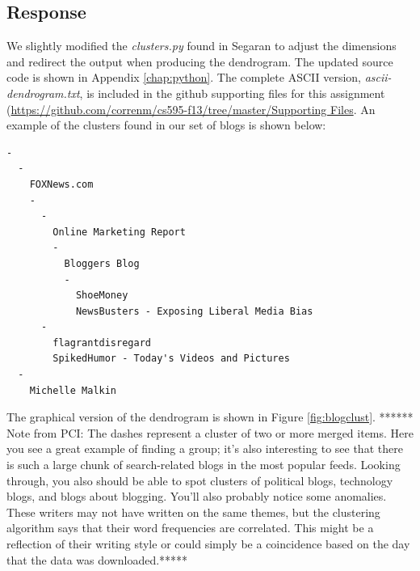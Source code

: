 \documentclass[letterpaper,11pt]{report}
\begin{document}
\begin{savenotes}
\subsection{Response}We slightly modified the \emph{clusters.py} found in Segaran \cite{segaran2007programming} to adjust the dimensions and redirect the output when producing the dendrogram. The updated source code is shown in Appendix \ref{chap:python}. The complete ASCII version, \emph{ascii-dendrogram.txt}, is included in the github supporting files for this assignment (\url{https://github.com/correnm/cs595-f13/tree/master/Supporting Files}. An example of the clusters found in our set of blogs is shown below:

\begin{verbatim}
-
  -
    FOXNews.com
    -
      -
        Online Marketing Report
        -
          Bloggers Blog
          -
            ShoeMoney
            NewsBusters - Exposing Liberal Media Bias
      -
        flagrantdisregard
        SpikedHumor - Today's Videos and Pictures
  -
    Michelle Malkin
\end{verbatim}

The graphical version of the dendrogram is shown in Figure \ref{fig:blogclust}.
****** Note from PCI: The dashes represent a cluster of two or more  merged  items.  Here  you  see  a  great  example  of  finding  a  group;  it’s  also
interesting to see that there is such a large chunk of search-related blogs in the most popular feeds. Looking through, you also should be able to spot clusters of political
blogs, technology blogs, and blogs about blogging. You’ll also probably notice some anomalies. These writers may not have written on the same themes, but the clustering algorithm says that their word frequencies are correlated.  This  might  be  a  reflection  of  their  writing  style  or  could  simply  be  a coincidence based on the day that the data was downloaded.*****


\end{savenotes}
\end{document}
